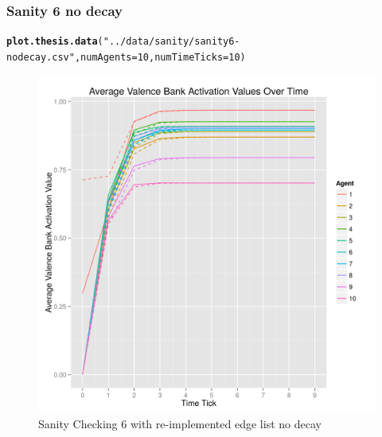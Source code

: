 \documentclass{article}\usepackage[]{graphicx}\usepackage[]{color}
\makeatletter
\def\maxwidth{ %
  \ifdim\Gin@nat@width>\linewidth
    \linewidth
  \else
    \Gin@nat@width
  \fi
}
\newcommand{\hlnum}[1]{\textcolor[rgb]{0.686,0.059,0.569}{#1}}%
\newcommand{\hlstr}[1]{\textcolor[rgb]{0.192,0.494,0.8}{#1}}%
\newcommand{\hlstd}[1]{\textcolor[rgb]{0.345,0.345,0.345}{#1}}%
\newcommand{\hlkwc}[1]{\textcolor[rgb]{0.333,0.667,0.333}{#1}}%
\newcommand{\hlkwd}[1]{\textcolor[rgb]{0.737,0.353,0.396}{\textbf{#1}}}%
\newenvironment{kframe}{%
 \def\at@end@of@kframe{}%
 \ifinner\ifhmode%
  \def\at@end@of@kframe{\end{minipage}}%
  \begin{minipage}{\columnwidth}%
 \fi\fi%
 \def\FrameCommand##1{\hskip\@totalleftmargin \hskip-\fboxsep
 \colorbox{shadecolor}{##1}\hskip-\fboxsep
     \hskip-\linewidth \hskip-\@totalleftmargin \hskip\columnwidth}%
 \MakeFramed {\advance\hsize-\width
   \@totalleftmargin\z@ \linewidth\hsize
   \@setminipage}}%
 {\par\unskip\endMakeFramed%
 \at@end@of@kframe}
\newenvironment{knitrout}{}{} %
\makeatother
\begin{document}
\subsubsection{Sanity 6 no decay}
\label{sec:sanity6-nodecay}
\begin{knitrout}
\color{fgcolor}\begin{kframe}
\begin{alltt}
\hlkwd{plot.thesis.data}\hlstd{(}\hlstr{"../data/sanity/sanity6-nodecay.csv"}\hlstd{,} \hlkwc{numAgents} \hlstd{=} \hlnum{10}\hlstd{,} \hlkwc{numTimeTicks} \hlstd{=} \hlnum{10}\hlstd{)}
\end{alltt}
\end{kframe}\begin{figure}[]

\includegraphics[width=\maxwidth]{figure/plot-sanity-6-nodecay} \caption[Sanity Checking 6 with re-implemented edge list no decay]{Sanity Checking 6 with re-implemented edge list no decay\label{fig:plot-sanity-6-nodecay}}
\end{figure}


\end{knitrout}


\newpage
\end{document}
